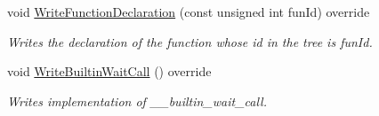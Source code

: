\begin{DoxyCompactItemize}
void \hyperlink{classDiscrepancyAnalysisCWriter_a190bda3bc90a238e772d319afd83becc}{Write\+Function\+Declaration} (const unsigned int fun\+Id) override
\begin{DoxyCompactList}\small\item\em Writes the declaration of the function whose id in the tree is fun\+Id. \end{DoxyCompactList}\item 
void \hyperlink{classDiscrepancyAnalysisCWriter_a614b57f4cd76435c0b7266ac677145d5}{Write\+Builtin\+Wait\+Call} () override
\begin{DoxyCompactList}\small\item\em Writes implementation of \+\_\+\+\_\+builtin\+\_\+wait\+\_\+call. \end{DoxyCompactList}\end{DoxyCompactItemize}
